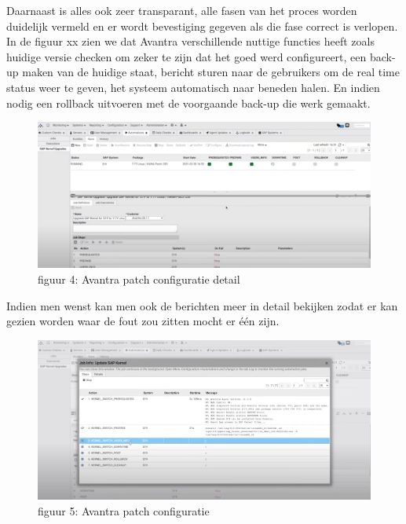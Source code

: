 \documentclass[dutch,dit,thesis]{hogentreport}
\begin{document}
Daarnaast is alles ook zeer transparant, alle fasen van het proces worden duidelijk vermeld en er wordt bevestiging gegeven als die fase correct is verlopen. In de figuur xx zien we dat Avantra verschillende
nuttige functies heeft zoals huidige versie checken om zeker te zijn dat het goed werd configureert, een back-up maken van de huidige staat, bericht sturen naar de gebruikers om de real time status weer
   te geven, het systeem automatisch naar beneden halen. En indien nodig een rollback uitvoeren met de voorgaande back-up die werk gemaakt.

\begin{figure}[htbp]
    \centering
    \includegraphics[width=\textwidth]{avantra2.png}
    \caption{figuur 4: Avantra patch configuratie detail}
     \label{fig:avantra2}
\end{figure}



Indien men wenst kan men ook de berichten meer in detail bekijken zodat er kan gezien worden waar de fout zou zitten mocht er één zijn.

\begin{figure}[htbp]
    \centering
    \includegraphics[width=\textwidth]{avantra3.png}
    \caption{figuur 5: Avantra patch configuratie}
     \label{fig:avantra1}
\end{figure}
\end{document}
